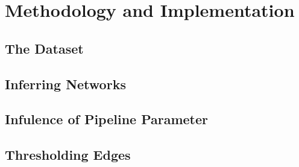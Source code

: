 \chapter{Methodology and Implementation}

\section{The Dataset}

\section{Inferring Networks}

\section{Infulence of Pipeline Parameter}

\section{Thresholding Edges}
